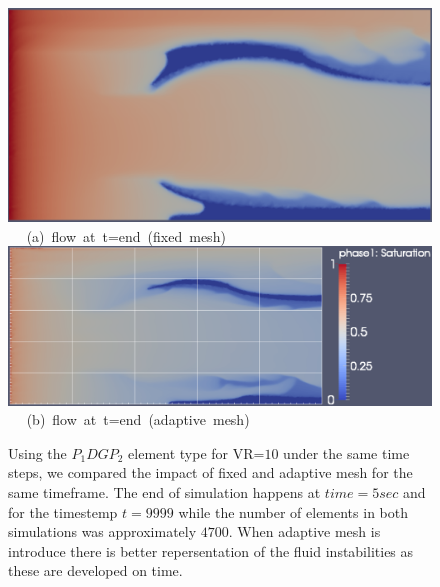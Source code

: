 \begin{landscape}
\begin{figure}[ht] 
\vbox{
\hbox{\hspace{3.5cm}
\includegraphics[width=.65\textwidth]{./Pics1/mr10_5regions_fixed/5regions_fixed_2000.pdf} 
}
\vspace{0.0cm}
\hbox{\hspace{6.5cm} (a) flow at t=end (fixed mesh)   
}
\vspace{0.25cm}
\hbox{\hspace{3.5cm}
\includegraphics[width=.9\textwidth]{./Pics1/mr10_5regions_adapt/5regions_adapt_3000_1.pdf}
}
\vspace{0.0cm}
\hbox{\hspace{6.5cm} (b) flow at t=end (adaptive mesh)     
}
}     
\caption{Using the $P_{1}DGP_{2}$ element type for VR=$10$ under the same time steps, we compared the impact of fixed and adaptive mesh for the same timeframe. The end of simulation happens at $time=5 sec$ and for the timestemp $t=9999$ while the number of elements in both simulations was approximately $4700$. When adaptive mesh is introduce there is better repersentation of the fluid instabilities as these are developed on time.}
\label{fig:2testcase_d}
\end{figure}
\end{landscape}
\clearpage



